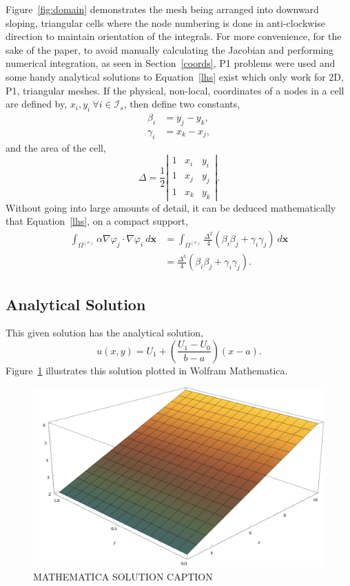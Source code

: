 Figure~\ref{fig:domain} demonstrates the mesh being arranged into downward sloping, triangular cells where the node numbering is done in anti-clockwise direction to maintain orientation of the integrals. For more convenience, for the sake of the paper, to avoid manually calculating the Jacobian and performing numerical integration, as seen in Section~\ref{coords}, P1 problems were used and some handy analytical solutions to Equation~\eqref{lhs} exist which only work for 2D, P1, triangular meshes. If the physical, non-local, coordinates of a nodes in a cell are defined by, $x_i, y_i~\forall i \in \mathcal{I}_s$, then define two constants,
\begin{align}
	\beta_i &= y_j - y_k,\\
	\gamma_i &= x_k - x_j,
\end{align} 
and the area of the cell,
\begin{equation}
	\Delta = \frac{1}{2}\left\vert
	\begin{matrix}
		1 & x_i & y_i \\
		1 & x_j & y_j \\
		1 & x_k & y_k
	\end{matrix}\right\vert.
\end{equation}
Without going into large amounts of detail, it can be deduced mathematically that Equation~\eqref{lhs}, on a compact support,
\begin{align}
	\int_{\Omega^{(e)}} \alpha \nabla \varphi_j \cdot \nabla \varphi_i~d\mathbf{x} &= \int_{\Omega^{(e)}}\frac{\Delta^2}{4}(\beta_i\beta_j + \gamma_i\gamma_j)~d\mathbf{x}\\
	&= \frac{\Delta^3}{4}(\beta_i\beta_j + \gamma_i\gamma_j).\label{conv}
\end{align}

\subsection{Analytical Solution}

This given solution has the analytical solution,
\begin{equation}
	u(x,y) = U_1 + \left(\frac{U_1 - U_0}{b - a}\right) (x - a).
\end{equation}
Figure~\ref{fig:soln} illustrates this solution plotted in Wolfram Mathematica.
\begin{figure}
	\centering
	\includegraphics[width=0.6\linewidth]{Figures/soln}
	\caption{MATHEMATICA SOLUTION CAPTION}
	\label{fig:soln}
\end{figure}

